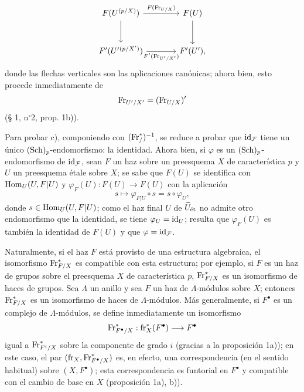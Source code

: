 \[
\begin{tikzcd}[column sep=large,row sep=large]
F(U^{(p/X)}) \arrow[r,"F(\Fr_{U/X})"] \arrow[d]
& F(U) \arrow[d]\\
F'(U'{}^{(p/X')}) \arrow[r,"F'(\Fr_{U'/X'})"']
& F'(U') ,
\end{tikzcd}
\]
donde las flechas verticales son las aplicaciones canónicas; ahora bien, esto procede inmediatamente de
\[
\operatorname{Fr}_{U'/X'}=(\operatorname{Fr}_{U/X})'
\]
(§ 1, n$^\circ$2, prop. 1b)).

Para probar c), componiendo con $(\operatorname{Fr}^*_{/})^{-1}$, se reduce a probar que $\operatorname{id}_{\mathcal F}$ tiene un único $(\operatorname{Sch})_p$-endomorfismo: la identidad. Ahora bien, si $\varphi$ es un $(\operatorname{Sch})_p$-endomorfismo de $\operatorname{id}_{\mathcal F}$, sean $F$ un haz sobre un preesquema $X$ de característica $p$ y $U$ un preesquema étale sobre $X$; se sabe que $F(U)$ se identifica con $\operatorname{Hom}_U(U,F|U)$ y $\varphi_F(U):F(U)\to F(U)$ con la aplicación
\[
s\longmapsto \varphi_{F|U}\circ s=s\circ\varphi_U,
\]
donde $s\in\operatorname{Hom}_U(U,F|U)$; como el haz final $U$ de $\widetilde U_{\mathrm{\acute{e}t}}$ no admite otro endomorfismo que la identidad, se tiene $\varphi_U=\operatorname{id}_U$; resulta que $\varphi_F(U)$ es también la identidad de $F(U)$ y que $\varphi=\operatorname{id}_{\mathcal F}$.

Naturalmente, si el haz $F$ está provisto de una estructura algebraica, el isomorfismo $\operatorname{Fr}^*_{F/X}$ es compatible con esta estructura; por ejemplo, si $F$ es un haz de grupos sobre el preesquema $X$ de característica $p$, $\operatorname{Fr}^*_{F/X}$ es un isomorfismo de haces de grupos. Sea $\Lambda$ un anillo y sea $F$ un haz de $\Lambda$-módulos sobre $X$; entonces $\operatorname{Fr}^*_{F/X}$ es un isomorfismo de haces de $\Lambda$-módulos. Más generalmente, si $F^\bullet$ es un complejo de $\Lambda$-módulos, se define inmediatamente un isomorfismo
\[
\operatorname{Fr}^*_{F^\bullet/X}:\operatorname{fr}_X^*(F^\bullet)\longrightarrow F^\bullet
\]
igual a $\operatorname{Fr}^*_{F^i/X}$ sobre la componente de grado $i$ (gracias a la proposición 1a)); en este caso, el par $(\operatorname{fr}_X,\operatorname{Fr}^*_{F^\bullet/X})$ es, en efecto, una correspondencia (en el sentido habitual) sobre $(X,F^\bullet)$; esta correspondencia es funtorial en $F^\bullet$ y compatible con el cambio de base en $X$ (proposición 1a), b)).
